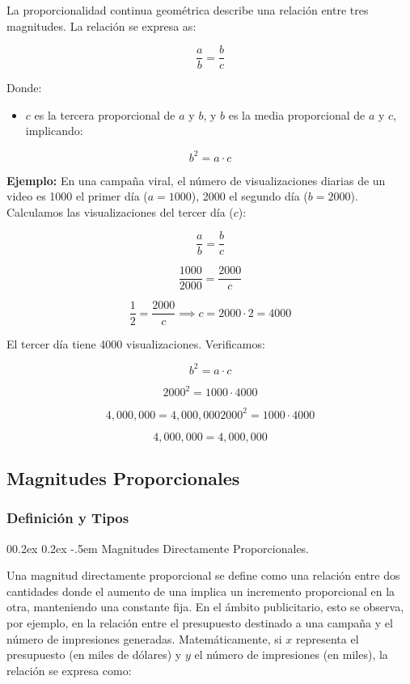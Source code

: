 \documentclass[
  stu,
  floatsintext,
  longtable,
  a4paper,
  nolmodern,
  notxfonts,
  notimes,
  colorlinks=true,linkcolor=blue,citecolor=blue,urlcolor=blue]{apa7}
\makeatletter
\renewcommand{\paragraph}{\@startsection{paragraph}{4}{\parindent}%
	{0\baselineskip \@plus 0.2ex \@minus 0.2ex}%
	{-.5em}%
	{\normalfont\normalsize\bfseries\typesectitle}}
\providecommand{\tightlist}{%
  \setlength{\itemsep}{0pt}\setlength{\parskip}{0pt}}
\makeatother
\begin{document}
La proporcionalidad continua geométrica describe una relación entre tres
magnitudes. La relación se expresa as:

\[
\frac{a}{b} = \frac{b}{c}
\]

Donde:

\begin{itemize}
\tightlist
\item
  \(c\) es la tercera proporcional de \(a\) y \(b\), y \(b\) es la media
  proporcional de \(a\) y \(c\), implicando:
\end{itemize}

\[
b^2 = a \cdot c
\]

\textbf{Ejemplo:} En una campaña viral, el número de visualizaciones
diarias de un video es 1000 el primer día (\(a = 1000\)), 2000 el
segundo día (\(b = 2000\)). Calculamos las visualizaciones del tercer
día (\(c\)):

\[
\frac{a}{b} = \frac{b}{c}
\]

\[
\frac{1000}{2000} = \frac{2000}{c}
\]

\[
\frac{1}{2} = \frac{2000}{c} \implies c = 2000 \cdot 2 = 4000
\]

El tercer día tiene 4000 visualizaciones. Verificamos:

\[
b^2 = a \cdot c
\]

\[
2000^2 = 1000 \cdot 4000
\]

\[
4,000,000 = 4,000,000
2000^2 = 1000 \cdot 4000
\]

\[
4,000,000 = 4,000,000
\]

\subsection{Magnitudes Proporcionales}\label{magnitudes-proporcionales}

\subsubsection{Definición y Tipos}\label{definiciuxf3n-y-tipos}

\paragraph{Magnitudes Directamente
Proporcionales.}\label{magnitudes-directamente-proporcionales}

Una magnitud directamente proporcional se define como una relación entre
dos cantidades donde el aumento de una implica un incremento
proporcional en la otra, manteniendo una constante fija. En el ámbito
publicitario, esto se observa, por ejemplo, en la relación entre el
presupuesto destinado a una campaña y el número de impresiones
generadas. Matemáticamente, si \(x\) representa el presupuesto (en miles
de dólares) y \(y\) el número de impresiones (en miles), la relación se
expresa como:
\end{document}
